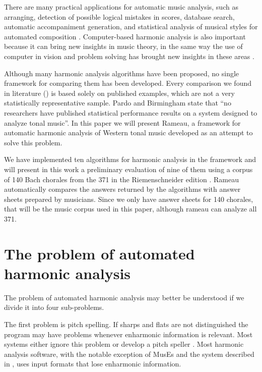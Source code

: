 \documentclass{article}
\begin{document}
There are many practical applications for automatic music analysis,
such as arranging, detection of possible logical mistakes in scores,
database search, automatic accompaniment generation, and statistical
analysis of musical styles for automated composition
\cite{pardo.ea:algorithms,temperley.ea:modeling}. Computer-based
harmonic analysis is also important because it can bring new insights
in music theory, in the same way the use of computer in vision and
problem solving has brought new insights in these areas
\cite{temperley.ea:modeling}.

Although many harmonic analysis algorithms have been proposed, no
single framework for comparing them has been developed. Every
comparison we found in literature (\cite{pardo.ea:automated,
  barthelemy.ea:figured, tsui:harmonic, taube:automatic,
  illescas.ea:harmonic}) is based solely on published examples, which
are not a very statistically representative sample. Pardo and
Birmingham \cite{pardo.ea:automated} state that ``no researchers have
published statistical performance results on a system designed to
analyze tonal music''. In this paper we will present Rameau, a
framework for automatic harmonic analysis of Western tonal music
developed as an attempt to solve this problem.

We have implemented ten algorithms for harmonic analysis in the
framework and will present in this work a preliminary evaluation of
nine of them using a corpus of 140 Bach chorales from the 371 in the
Riemenschneider edition \cite{bach:371}. Rameau automatically compares
the answers returned by the algorithms with answer sheets prepared by
musicians. Since we only have answer sheets for 140 chorales, that
will be the music corpus used in this paper, although rameau can
analyze all 371.

\section{The problem of automated harmonic analysis}
\label{sec:problem}

The problem of automated harmonic analysis may better be understood if
we divide it into four sub-problems.

The first problem is pitch spelling. If sharps and flats are not
distinguished the program may have problems whenever enharmonic
information is relevant. Most systems either ignore this problem or
develop a pitch speller \cite{temperley.ea:modeling}. Most harmonic
analysis software, with the notable exception of MusEs
\cite{pachet.ea:representing} and the system described in
\cite{illescas.ea:harmonic}, uses input formats that lose enharmonic
information.
\end{document}
